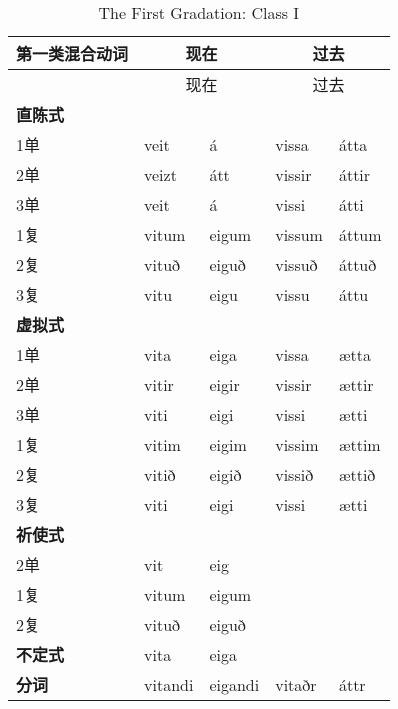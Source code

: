 \begin{longtable}{lllll}
  \caption[The First Gradation: Class I]{The First Gradation: Class
    I}\tabularnewline
  \toprule
  第一类混合动词  & \multicolumn{2}{c}{现在} & \multicolumn{2}{c}{过去}                  \\\midrule\endfirsthead{} &\multicolumn{2}{c}{现在} &\multicolumn{2}{c}{过去} \\
  \midrule
  \endhead
  \bottomrule
  \endfoot
  \textbf{直陈式} & ~                        & ~                        & ~      & ~     \\
  1单             & veit                     & á                        & vissa  & átta  \\
  2单             & veizt                    & átt                      & vissir & áttir \\
  3单             & veit                     & á                        & vissi  & átti  \\
  1复             & vitum                    & eigum                    & vissum & áttum \\
  2复             & vituð                    & eiguð                    & vissuð & áttuð \\
  3复             & vitu                     & eigu                     & vissu  & áttu  \\
  \textbf{虚拟式} & ~                        & ~                        & ~      & ~     \\
  1单             & vita                     & eiga                     & vissa  & ætta  \\
  2单             & vitir                    & eigir                    & vissir & ættir \\
  3单             & viti                     & eigi                     & vissi  & ætti  \\
  1复             & vitim                    & eigim                    & vissim & ættim \\
  2复             & vitið                    & eigið                    & vissið & ættið \\
  3复             & viti                     & eigi                     & vissi  & ætti  \\
  \textbf{祈使式} & ~                        & ~                        & ~      & ~     \\
  2单             & vit                      & eig                      & ~      & ~     \\
  1复             & vitum                    & eigum                    & ~      & ~     \\
  2复             & vituð                    & eiguð                    & ~      & ~     \\
  \textbf{不定式} & vita                     & eiga                     & ~      & ~     \\
  \textbf{分词}   & vitandi                  & eigandi                  & vitaðr & áttr  \\
\end{longtable}

